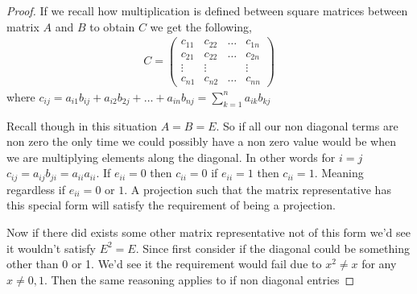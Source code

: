 \documentclass[12pt]{article}
\begin{document}
\begin{itemize}
\begin{itemize}
\begin{proof}
        If we recall how multiplication is defined between square matrices between matrix $A$ and $B$ to obtain $C$ we get the following,
        \begin{align*}
            C = \begin{pmatrix}
                c_{11} & c_{22} & \dots & c_{1n} \\
                c_{21} & c_{22} & \dots & c_{2n} \\
                \vdots & \vdots & & \vdots \\
                c_{n1} & c_{n2} & \dots & c_{nn}
            \end{pmatrix}
        \end{align*}
        where $c_{ij} = a_{i1}b_{ij} + a_{i2}b_{2j} + \dots + a_{in}b_{nj} = \sum_{k = 1}^n a_{ik}b_{kj}$ 

        Recall though in this situation $A = B = E$. So if all our non diagonal terms are non zero the only time we could possibly have a non zero value would be when we are multiplying elements along the diagonal. In other words  for $i = j$ $c_{ij} = a_{ij} b_{ji} = a_{ii}a_{ii}$. If $e_{ii} = 0$ then $c_{ii} = 0$ if $e_{ii} = 1$ then $c_{ii} = 1$. Meaning regardless if $e_{ii} = 0 $ or $1$. A projection such that the matrix representative has this special form will satisfy the requirement of being a projection. 

        Now if there did exists some other matrix representative not of this form we'd see it wouldn't satisfy $E^2 = E$. Since first consider if the diagonal could be something other than 0 or 1. We'd see it the requirement would fail due to $x^2 \neq x$ for any $x \neq 0,1$. Then the same reasoning applies to if non diagonal entries
    \end{proof}
    

\end{itemize}
\end{itemize}
\end{document}
